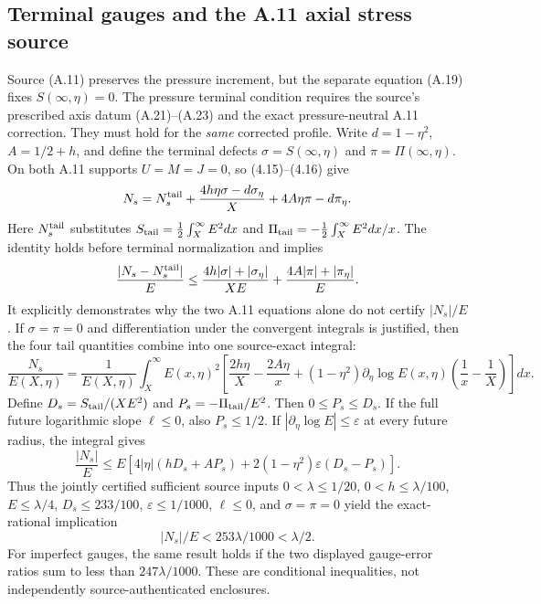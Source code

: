 \subsection*{Terminal gauges and the A.11 axial stress source}
Source (A.11) preserves the pressure increment, but the separate
equation (A.19) fixes $S(\infty,\eta)=0$.
The pressure terminal condition requires the source's prescribed
axis datum (A.21)--(A.23) and the exact pressure-neutral A.11
correction. They must hold for the \emph{same} corrected profile.
Write $d=1-\eta^2$, $A=1/2+h$, and define the terminal defects
$\sigma=S(\infty,\eta)$ and $\pi=\Pi(\infty,\eta)$.
On both A.11 supports $U=M=J=0$, so (4.15)--(4.16) give
\begin{equation}\label{eq:A11-terminal-gauge-full}
 N_s=N_s^{\rm tail}
 +\frac{4h\eta\sigma-d\sigma_\eta}{X}
 +4A\eta\pi-d\pi_\eta .
\end{equation}
Here $N_s^{\rm tail}$ substitutes
$S_{\rm tail}=\frac12\int_X^\infty E^2dx$ and
$\Pi_{\rm tail}=-\frac12\int_X^\infty E^2dx/x$.
The identity holds before terminal normalization and implies
\[
 \frac{|N_s-N_s^{\rm tail}|}{E}
 \le\frac{4h|\sigma|+|\sigma_\eta|}{XE}
 +\frac{4A|\pi|+|\pi_\eta|}{E}.
\]
It explicitly demonstrates why the two A.11 equations alone
do not certify $|N_s|/E$.
If $\sigma=\pi=0$ and differentiation under the convergent
integrals is justified, then the four tail quantities combine
into one source-exact integral:
\begin{equation}\label{eq:A11-single-future-gate}
 \frac{N_s}{E(X,\eta)}
 =\frac1{E(X,\eta)}\int_X^\infty E(x,\eta)^2
 \left[\frac{2h\eta}{X}-\frac{2A\eta}{x}
 +(1-\eta^2)\partial_\eta\log E(x,\eta)
 \left(\frac1x-\frac1X\right)\right]dx .
\end{equation}
Define $D_s=S_{\rm tail}/(XE^2)$ and
$P_s=-\Pi_{\rm tail}/E^2$. Then $0\le P_s\le D_s$.
If the full future logarithmic slope $\ell\le0$, also
$P_s\le1/2$. If $|\partial_\eta\log E|\le\varepsilon$
at every future radius, the integral gives
\[
 \frac{|N_s|}{E}\le E\left[
 4|\eta|(hD_s+AP_s)
 +2(1-\eta^2)\varepsilon(D_s-P_s)\right].
\]
Thus the jointly certified sufficient source inputs
$0<\lambda\le1/20$, $0<h\le\lambda/100$,
$E\le\lambda/4$, $D_s\le233/100$,
$\varepsilon\le1/1000$, $\ell\le0$, and
$\sigma=\pi=0$ yield the exact-rational implication
\begin{equation}\label{eq:A11-terminal-strict-slack}
 |N_s|/E<253\lambda/1000<\lambda/2 .
\end{equation}
For imperfect gauges, the same result holds if the
two displayed gauge-error ratios sum to less than
$247\lambda/1000$. These are conditional inequalities,
not independently source-authenticated enclosures.


